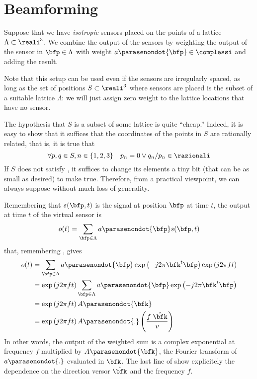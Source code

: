 \documentclass[11pt]{article}
\newcommand{\wv}{\bfk}
\newcommand{\wvn}{\hat\wv}
\newcommand{\x}[1][0]{\ifcase #1\bfp \or\bfq\else x#1\fi}
\newcommand{\sig}[1][\x,t]{s({#1})}
\newcommand{\out}[1][t]{o({#1})}
\newcommand{\coeff}[1][\x]{a\parasenondot{#1}}
\newcommand{\Coeff}[1][\wv]{A\parasenondot{#1}}
\begin{document}
\section{Beamforming}
\label{sect:1;beamforming-notes}

Suppose that we have \emph{isotropic} sensors placed on the points of
a lattice $\Lambda \subset \reali^3$.  We combine the output of the
sensors by weighting the output of the sensor in $\x \in \Lambda$
with weight $\coeff\in\complessi$ and adding the result.

\begin{commento}
  Note that this setup can be used even if the sensors are
  irregularly spaced, as long as the set of positions $S \subset\reali^3$ where
  sensors are placed is the subset of a suitable lattice $\Lambda$: we
  will just assign zero weight to the lattice locations that have no
  sensor.

  The hypothesis that $S$ is a subset of some lattice is quite
  ``cheap.'' Indeed, it is easy to show that it suffices that the
  coordinates of the points in $S$ are rationally related, that is, it
  is true that
\begin{equation}
\label{eq:0;beamforming-notes}
\forall p,q \in S,  n \in \{1, 2, 3\}
\quad p_n=0 \vee q_n/p_n \in \razionali
\end{equation}
%
If $S$ does not satisfy , it suffices to
change its elements a tiny bit (that can be as small as desired) to
make  true.  Therefore, from a practical
viewpoint, we can always suppose  without
much loss of generality.
\end{commento}

Remembering that $\sig$ is the signal at position $\x$ at time $t$,
the output at time $t$ of the virtual sensor is
%
\begin{equation}
\label{eq:5;beamforming-notes}
\out = \sum_{\x \in \Lambda} \coeff \sig
\end{equation}
%
that, remembering , gives
%
\begin{equation}
\label{eq:6;beamforming-notes}
\begin{split}
  \out &= \sum_{\x \in \Lambda} \coeff \exp\left(-j 2\pi \wv^t\x \right)
    \exp\left(j 2\pi ft\right)\\
   &= \exp\left(j 2\pi ft\right) \sum_{\x \in \Lambda} \coeff
    \exp\left(-j 2\pi \wv^t\x \right) 
    \\
    &= \exp\left(j 2\pi ft\right) \Coeff \\
    &= \exp\left(j 2\pi ft\right) \Coeff[.]\left(\frac{f\;\wvn}{v} \right)
\end{split}
\end{equation}
%
In other words, the output of the weighted sum is a complex
exponential at frequency $f$ multiplied by $\Coeff$, the Fourier
transform of $\coeff[.]$ evaluated in $\wv$. The last line of
 show explicitely the dependence on the
direction versor $\wvn$ and the frequency $f$.
\end{document}
